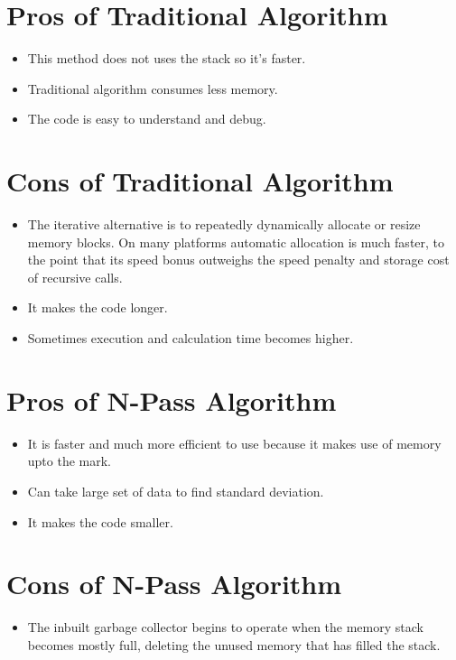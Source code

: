 \documentclass[a4paper, 12pt]{article}
\begin{document}
\section*{Pros of Traditional Algorithm}
\begin{itemize}
        \item This method does not uses the stack so it's faster.
        \item Traditional algorithm consumes less memory.
        \item The code is easy to understand and debug.
    \end{itemize}
\section*{Cons of Traditional Algorithm}
\begin{itemize}
        \item The iterative alternative is to repeatedly dynamically allocate or resize memory blocks. On many platforms automatic allocation is much faster, to the point that its speed bonus outweighs the speed penalty and storage cost of recursive calls.
        \item It makes the code longer.
        \item Sometimes execution and calculation time becomes higher.
    \end{itemize}
\section*{Pros of N-Pass Algorithm}
\begin{itemize}
        \item It is faster and much more efficient to use because it makes use of memory upto the mark. 
        \item Can take large set of data to find standard deviation.
        \item It makes the code smaller.

    \end{itemize}
\section*{Cons of N-Pass Algorithm}
\begin{itemize}
        \item The inbuilt garbage collector begins to operate when the memory stack becomes mostly full, deleting the unused memory that has filled the stack.

    \end{itemize}
    
\end{document}
